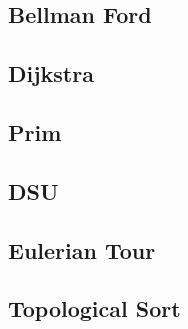 \documentclass[a4paper,landscape]{article}
\begin{document}
\begin{multicols}{2}
\subsection{Bellman Ford}
	
\subsection{Dijkstra}
	
\subsection{Prim}
	
\subsection{DSU}
	
\subsection{Eulerian Tour}
	
\subsection{Topological Sort}
	

\end{multicols}
\end{document}
